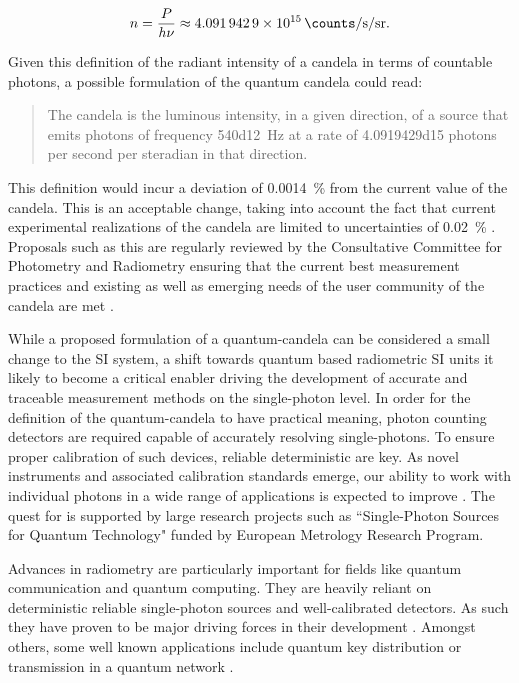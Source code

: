 		\begin{equation}
			n = \frac{P}{h \nu} \approx \SI{4.0919429d15}{\counts\per\second\per\steradian}.
		\end{equation}

	Given this definition of the radiant intensity of a candela in terms of countable photons, a possible formulation of the quantum candela could read:

	\begin{quote}
		The candela is the luminous intensity, in a given direction, of a source that emits photons of frequency \SI{540d12}{\hertz} at a rate of \num{4.0919429d15} photons per second per steradian in that direction.
	\end{quote}

	This definition would incur a deviation of \SI{0.0014}{\percent} from the current value of the candela. This is an acceptable change, taking into account the fact that current experimental realizations of the candela are limited to uncertainties of \SI{0.02}{\percent} \cite{Cheung2007}. Proposals such as this are regularly reviewed by the Consultative Committee for Photometry and Radiometry ensuring that the current best measurement practices and existing as well as emerging needs of the user community of the candela are met \cite{zwinckels::paper}.

	While a proposed formulation of a quantum-candela can be considered a small change to the SI system, a shift towards quantum based radiometric SI units it likely to become a critical enabler driving the development of accurate and traceable measurement methods on the single-photon level. In order for the definition of the quantum-candela to have practical meaning, photon counting detectors are required capable of accurately resolving single-photons. To ensure proper calibration of such devices, reliable deterministic \spss are key. As novel instruments and associated calibration standards emerge, our ability to work with individual photons in a wide range of applications is expected to improve \cite{Rodiek2017::1, Rodiek2017::2, Rodiek2017::3, Rodiek2017::4}. The quest for \spss is supported by large research projects such as ``Single-Photon Sources for Quantum Technology" funded by European Metrology Research Program.

	Advances in radiometry are particularly important for fields like quantum communication and quantum computing. They are heavily reliant on deterministic reliable single-photon sources and well-calibrated detectors. As such they have proven to be major driving forces in their development \cite{vaigu2017::1, vaigu2017::2}. Amongst others, some well known applications include quantum key distribution \cite{janine::12, janine::28, janine::29} or transmission in a quantum network \cite{janine::18, janine::51, janine::54}.

